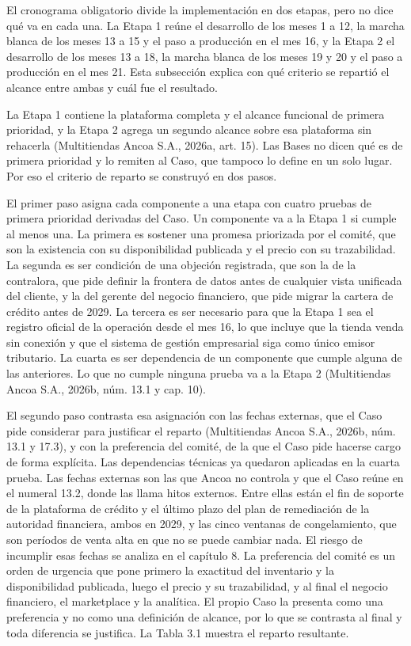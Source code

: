 \documentclass[11pt]{article}
\begin{document}
El cronograma obligatorio divide la implementación en dos etapas, pero no dice qué va en cada una. La Etapa 1 reúne el desarrollo de los meses 1 a 12, la marcha blanca de los meses 13 a 15 y el paso a producción en el mes 16, y la Etapa 2 el desarrollo de los meses 13 a 18, la marcha blanca de los meses 19 y 20 y el paso a producción en el mes 21. Esta subsección explica con qué criterio se repartió el alcance entre ambas y cuál fue el resultado.

La Etapa 1 contiene la plataforma completa y el alcance funcional de primera prioridad, y la Etapa 2 agrega un segundo alcance sobre esa plataforma sin rehacerla (Multitiendas Ancoa S.A., 2026a, art. 15). Las Bases no dicen qué es de primera prioridad y lo remiten al Caso, que tampoco lo define en un solo lugar. Por eso el criterio de reparto se construyó en dos pasos.

El primer paso asigna cada componente a una etapa con cuatro pruebas de primera prioridad derivadas del Caso. Un componente va a la Etapa 1 si cumple al menos una. La primera es sostener una promesa priorizada por el comité, que son la existencia con su disponibilidad publicada y el precio con su trazabilidad. La segunda es ser condición de una objeción registrada, que son la de la contralora, que pide definir la frontera de datos antes de cualquier vista unificada del cliente, y la del gerente del negocio financiero, que pide migrar la cartera de crédito antes de 2029. La tercera es ser necesario para que la Etapa 1 sea el registro oficial de la operación desde el mes 16, lo que incluye que la tienda venda sin conexión y que el sistema de gestión empresarial siga como único emisor tributario. La cuarta es ser dependencia de un componente que cumple alguna de las anteriores. Lo que no cumple ninguna prueba va a la Etapa 2 (Multitiendas Ancoa S.A., 2026b, núm. 13.1 y cap. 10).

El segundo paso contrasta esa asignación con las fechas externas, que el Caso pide considerar para justificar el reparto (Multitiendas Ancoa S.A., 2026b, núm. 13.1 y 17.3), y con la preferencia del comité, de la que el Caso pide hacerse cargo de forma explícita. Las dependencias técnicas ya quedaron aplicadas en la cuarta prueba. Las fechas externas son las que Ancoa no controla y que el Caso reúne en el numeral 13.2, donde las llama hitos externos. Entre ellas están el fin de soporte de la plataforma de crédito y el último plazo del plan de remediación de la autoridad financiera, ambos en 2029, y las cinco ventanas de congelamiento, que son períodos de venta alta en que no se puede cambiar nada. El riesgo de incumplir esas fechas se analiza en el capítulo 8. La preferencia del comité es un orden de urgencia que pone primero la exactitud del inventario y la disponibilidad publicada, luego el precio y su trazabilidad, y al final el negocio financiero, el marketplace y la analítica. El propio Caso la presenta como una preferencia y no como una definición de alcance, por lo que se contrasta al final y toda diferencia se justifica. La Tabla 3.1 muestra el reparto resultante.
\end{document}
